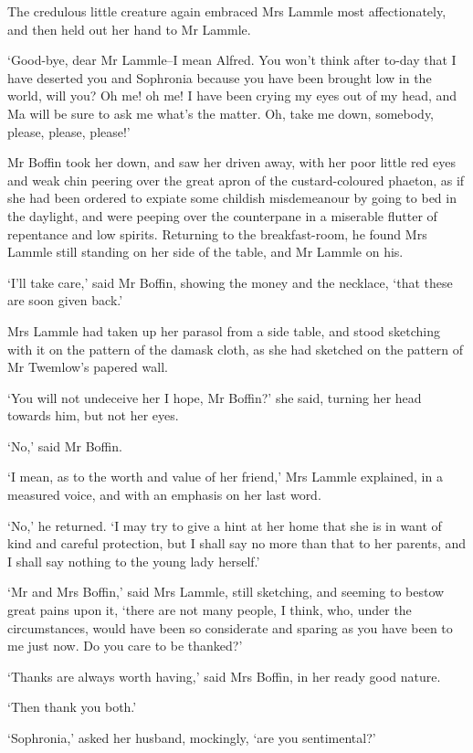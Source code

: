 The credulous little creature again embraced Mrs Lammle most
affectionately, and then held out her hand to Mr Lammle.

‘Good-bye, dear Mr Lammle--I mean Alfred. You won’t think after to-day
that I have deserted you and Sophronia because you have been brought low
in the world, will you? Oh me! oh me! I have been crying my eyes out of
my head, and Ma will be sure to ask me what’s the matter. Oh, take me
down, somebody, please, please, please!’

Mr Boffin took her down, and saw her driven away, with her poor
little red eyes and weak chin peering over the great apron of the
custard-coloured phaeton, as if she had been ordered to expiate some
childish misdemeanour by going to bed in the daylight, and were peeping
over the counterpane in a miserable flutter of repentance and low
spirits. Returning to the breakfast-room, he found Mrs Lammle still
standing on her side of the table, and Mr Lammle on his.

‘I’ll take care,’ said Mr Boffin, showing the money and the necklace,
‘that these are soon given back.’

Mrs Lammle had taken up her parasol from a side table, and stood
sketching with it on the pattern of the damask cloth, as she had
sketched on the pattern of Mr Twemlow’s papered wall.

‘You will not undeceive her I hope, Mr Boffin?’ she said, turning her
head towards him, but not her eyes.

‘No,’ said Mr Boffin.

‘I mean, as to the worth and value of her friend,’ Mrs Lammle explained,
in a measured voice, and with an emphasis on her last word.

‘No,’ he returned. ‘I may try to give a hint at her home that she is in
want of kind and careful protection, but I shall say no more than that
to her parents, and I shall say nothing to the young lady herself.’

‘Mr and Mrs Boffin,’ said Mrs Lammle, still sketching, and seeming to
bestow great pains upon it, ‘there are not many people, I think, who,
under the circumstances, would have been so considerate and sparing as
you have been to me just now. Do you care to be thanked?’

‘Thanks are always worth having,’ said Mrs Boffin, in her ready good
nature.

‘Then thank you both.’

‘Sophronia,’ asked her husband, mockingly, ‘are you sentimental?’


